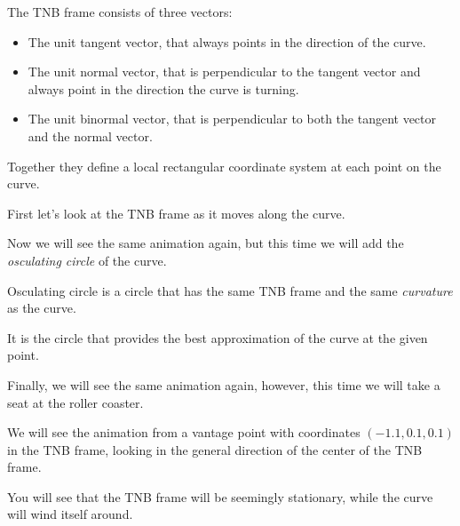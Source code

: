 \documentclass[aspectratio=169]{beamer}
\begin{document}
\begin{frame}
    The TNB frame consists of three vectors:\pause
    \begin{itemize}
        \item The \color{red}unit tangent vector\color{black}, that always points in
            the direction of the curve.\pause
        \item The \color{green}unit normal vector\color{black}, that is
            perpendicular to the tangent vector and always point in the
            direction the curve is turning.\pause
        \item The \color{blue}unit binormal vector\color{black}, that is
            perpendicular to both the tangent vector and the normal vector.
    \end{itemize}\pause
    Together they define a local rectangular coordinate system at each point on
    the curve.\pause

    First let's look at the TNB frame as it moves along the curve.
\end{frame}
\begin{frame}
    Now we will see the same animation again, but this time we will add the
    \emph{osculating circle} of the curve.  \pause
    
    Osculating circle is a circle that has the same TNB frame and the same
    \emph{curvature} as the curve. \pause

    It is the circle that provides the best approximation of the curve at the
    given point.
\end{frame}
\begin{frame}
    Finally, we will see the same animation again, however, this time we will
    take a seat at the roller coaster.\pause

    We will see the animation from a vantage point with coordinates $(-1.1,
    0.1, 0.1)$ \alert{in the TNB frame}, looking in the general direction of the center
    of the TNB frame.\pause

    You will see that the TNB frame will be seemingly stationary, while the
    curve will wind itself around.
\end{frame}
\end{document}
